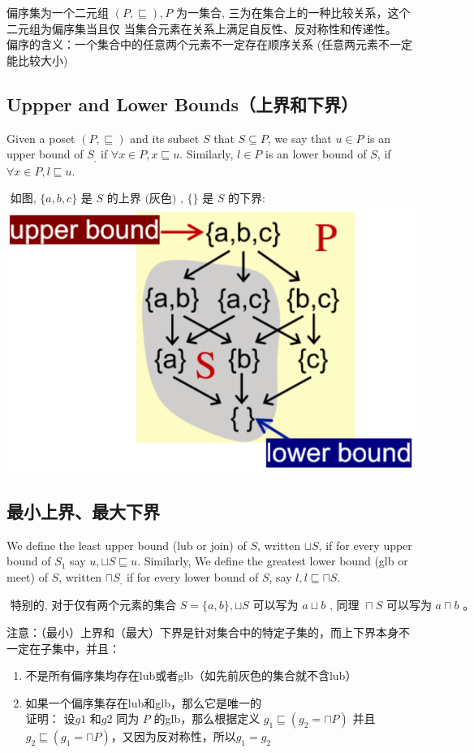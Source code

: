 \documentclass[a4paper]{article}
\theoremstyle{definition}
\begin{document}
偏序集为一个二元组 $(P, \sqsubseteq), P$ 为一集合, 三为在集合上的一种比较关系，这个二元组为偏序集当且仅
当集合元素在关系上满足自反性、反对称性和传递性。\\
偏序的含义：一个集合中的任意两个元素不一定存在顺序关系 (任意两元素不一定能比较大小)
\subsection{Uppper and Lower Bounds（上界和下界）}
Given a poset $(P, \sqsubseteq)$ and its subset $S$ that $S \subseteq P$, we say that $u \in P$ is an upper bound of
$S_{,}$ if $\forall x \in P, x \sqsubseteq u$. Similarly, $l \in P$ is an lower bound of $S$, if $\forall x \in P, l \sqsubseteq u$.

$\text { 如图, }\{a, b, c\} \text { 是 } S \text { 的上界 (灰色) , }\{\} \text { 是 } S \text { 的下界: }$\\
\includegraphics{img/Snipaste_2021-06-03_15-42-54.png}

\subsection{最小上界、最大下界}
We define the least upper bound (lub or join) of $S$, written $\sqcup S$, if for every upper bound
of $S_{1}$ say $u, \sqcup S \sqsubseteq u$. Similarly, We define the greatest lower bound (glb or meet) of $S$,
written $\sqcap S_{,}$ if for every lower bound of $S$, say $l, l \sqsubseteq \sqcap S$.

$\text { 特别的, 对于仅有两个元素的集合 } S=\{a, b\}, \sqcup S \text { 可以写为 } a \sqcup b \text { , 同理 } \sqcap S \text { 可以写为 } a \sqcap b \text { 。 }$

注意：（最小）上界和（最大）下界是针对集合中的特定子集的，而上下界本身不一定在子集中，并且：
\begin{enumerate}
  \item 不是所有偏序集均存在lub或者glb（如先前灰色的集合就不含lub）
  \item 如果一个偏序集存在lub和glb，那么它是唯一的\\
  证明： 设$g1$ 和$g2$ 同为 $P$ 的glb，那么根据定义 $g_1\sqsubseteq(g_2=\sqcap P)$ 并且$g_2\sqsubseteq(g_1=\sqcap P)$，又因为反对称性，所以$g_1=g_2$
  \end{enumerate}
\end{document}
